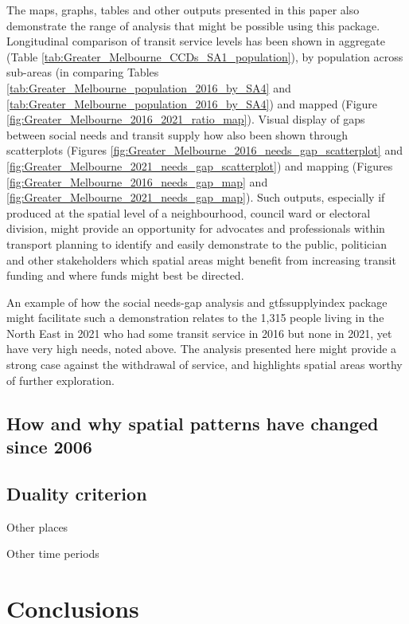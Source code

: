 \documentclass[preprint, 3p,
authoryear]{elsarticle} %
\begin{document}
The maps, graphs, tables and other outputs presented in this paper also
demonstrate the range of analysis that might be possible using this
package. Longitudinal comparison of transit service levels has been
shown in aggregate (Table
\ref{tab:Greater_Melbourne_CCDs_SA1_population}), by population across
sub-areas (in comparing Tables
\ref{tab:Greater_Melbourne_population_2016_by_SA4} and
\ref{tab:Greater_Melbourne_population_2016_by_SA4}) and mapped (Figure
\ref{fig:Greater_Melbourne_2016_2021_ratio_map}). Visual display of gaps
between social needs and transit supply how also been shown through
scatterplots (Figures
\ref{fig:Greater_Melbourne_2016_needs_gap_scatterplot} and
\ref{fig:Greater_Melbourne_2021_needs_gap_scatterplot}) and mapping
(Figures \ref{fig:Greater_Melbourne_2016_needs_gap_map} and
\ref{fig:Greater_Melbourne_2021_needs_gap_map}). Such outputs,
especially if produced at the spatial level of a neighbourhood, council
ward or electoral division, might provide an opportunity for advocates
and professionals within transport planning to identify and easily
demonstrate to the public, politician and other stakeholders which
spatial areas might benefit from increasing transit funding and where
funds might best be directed.

An example of how the social needs-gap analysis and gtfssupplyindex
package might facilitate such a demonstration relates to the 1,315
people living in the North East in 2021 who had some transit service in
2016 but none in 2021, yet have very high needs, noted above. The
analysis presented here might provide a strong case against the
withdrawal of service, and highlights spatial areas worthy of further
exploration.

\hypertarget{how-and-why-spatial-patterns-have-changed-since-2006}{%
\subsection{How and why spatial patterns have changed since
2006}\label{how-and-why-spatial-patterns-have-changed-since-2006}}

\hypertarget{duality-criterion}{%
\subsection{Duality criterion}\label{duality-criterion}}

Other places

Other time periods

\hypertarget{conclusions}{%
\section{Conclusions}\label{conclusions}}
\end{document}
